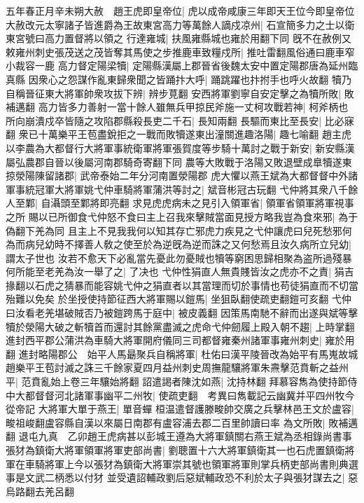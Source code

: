 五年春正月辛未朔大赦　趙王虎即皇帝位|{
	虎以成帝咸康三年即天王位今即皇帝位}
大赦改元太寧諸子皆進爵為王故東宮高力等萬餘人謫戍凉州|{
	石宣簡多力之士以衛東宮號曰高力置督將以領之}
行達雍城|{
	扶風雍縣城也雍於用翻下同}
旣不在赦例又敕雍州刺史張茂送之茂皆奪其馬使之步推鹿車致糧戍所|{
	推吐雷翻風俗通曰鹿車窄小裁容一鹿}
高力督定陽梁犢|{
	定陽縣漢屬上郡晉省後魏太安中置定陽郡唐為延州臨真縣}
因衆心之怨謀作亂東歸衆聞之皆踊抃大呼|{
	踊跳躍也抃拊手也呼火故翻}
犢乃自稱晉征東大將軍帥衆攻拔下辨|{
	辨步莧翻}
安西將軍劉寧自安定擊之為犢所敗|{
	敗補邁翻}
高力皆多力善射一當十餘人雖無兵甲掠民斧施一丈柯攻戰若神|{
	柯斧柄也}
所向崩潰戍卒皆隨之攻陷郡縣殺長吏二千石|{
	長知兩翻}
長驅而東比至長安|{
	比必寐翻}
衆已十萬樂平王苞盡銳拒之一戰而敗犢遂東出潼關進趣洛陽|{
	趣七喻翻}
趙主虎以李農為大都督行大將軍事統衛軍將軍張賀度等步騎十萬討之戰于新安|{
	新安縣漢屬弘農郡自晉以後屬河南郡騎奇寄翻下同}
農等大敗戰于洛陽又敗退壁成臯犢遂東掠滎陽陳留諸郡|{
	武帝泰始二年分河南置滎陽郡}
虎大懼以燕王斌為大都督督中外諸軍事統冠軍大將軍姚弋仲車騎將軍蒲洪等討之|{
	斌音彬冠古玩翻}
弋仲將其衆八千餘人至鄴|{
	自灄頭至鄴將即亮翻}
求見虎虎病未之見引入領軍省|{
	領軍省領軍將軍視事之所}
賜以已所御食弋仲怒不食曰主上召我來擊賊當面見授方略我豈為食來邪|{
	為于偽翻下羌為同}
且主上不見我我何以知其存亡邪虎力疾見之弋仲讓虎曰兒死愁邪何為而病兒幼時不擇善人敎之使至於為逆旣為逆而誅之又何愁焉且汝久病所立兒幼|{
	謂太子世也}
汝若不愈天下必亂當先憂此勿憂賊也犢等窮困思歸相聚為盗所過殘暴何所能至老羌為汝一舉了之|{
	了决也}
弋仲性狷直人無貴賤皆汝之虎亦不之責|{
	狷吉掾翻以石虎之猜暴而能容姚弋仲之狷直者以其當理而切於事情也苟徒狷直而不切當殆難以免矣}
於坐授使持節征西大將軍賜以鎧馬|{
	坐狙臥翻使疏吏翻鎧可亥翻}
弋仲曰汝看老羌堪破賊否乃被鎧跨馬于庭中|{
	被皮義翻}
因策馬南馳不辭而出遂與斌等擊犢於滎陽大破之斬犢首而還討其餘黨盡滅之虎命弋仲劒履上殿入朝不趨|{
	上時掌翻}
進封西平郡公蒲洪為車騎大將軍開府儀同三司都督雍秦州諸軍事雍州刺史|{
	雍於用翻}
進封略陽郡公　始平人馬朂聚兵自稱將軍|{
	杜佑曰漢平陵晉改為始平有馬嵬故城}
趙樂平王苞討滅之誅三千餘家夏四月益州刺史周撫龍驤將軍朱燾擊范賁斬之益州平|{
	范賁亂始上卷三年驤始將翻}
詔遣謁者陳沈如燕|{
	沈持林翻}
拜慕容雋為使持節侍中大都督督河北諸軍事幽平二州牧|{
	使疏吏翻　考異曰雋載記云幽冀并平四州牧今從帝記}
大將軍大單于燕王|{
	單音蟬}
桓温遣督護滕畯帥交廣之兵擊林邑王文於盧容|{
	畯祖峻翻盧容縣自漢以來屬日南郡有盧容浦去郡二百里帥讀曰率}
為文所敗|{
	敗補邁翻}
退屯九真　乙卯趙王虎病甚以彭城王遵為大將軍鎮關右燕王斌為丞相錄尚書事張犲為鎮衛大將軍領軍將軍吏部尚書|{
	劉聰置十六大將軍鎮衛其一也石虎置鎮衛將軍在車騎將軍上今以張犲為鎮衛大將軍崇其號也領軍將軍則掌兵柄吏部尚書則典選事是文武二柄悉以付犲}
並受遺詔輔政劉后惡斌輔政恐不利於太子與張犲謀去之|{
	惡烏路翻去羌呂翻}
